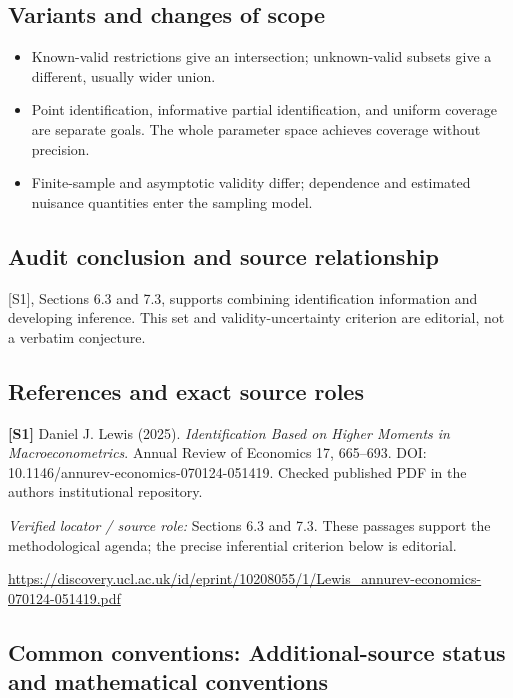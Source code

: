 \documentclass[11pt,a4paper]{article}
\begin{document}
\subsection*{Variants and changes of scope}

\begin{itemize}
\item Known-valid restrictions give an intersection; unknown-valid subsets give a different, usually wider union.
\item Point identification, informative partial identification, and uniform coverage are separate goals. The whole parameter space achieves coverage without precision.
\item Finite-sample and asymptotic validity differ; dependence and estimated nuisance quantities enter the sampling model.
\end{itemize}

\subsection*{Audit conclusion and source relationship}

[S1], Sections 6.3 and 7.3, supports combining identification information and developing inference. This set and validity-uncertainty criterion are editorial, not a verbatim conjecture.

\subsection*{References and exact source roles}

{\footnotesize\raggedright
\par\noindent\textbf{[S1]} Daniel J. Lewis (2025). \emph{Identification Based on Higher Moments in Macroeconometrics}. Annual Review of Economics 17, 665--693. DOI: 10.1146/annurev-economics-070124-051419. Checked published PDF in the author\textquotesingle s institutional repository.\par \textit{Verified locator / source role:} Sections 6.3 and 7.3. These passages support the methodological agenda; the precise inferential criterion below is editorial.\par \url{https://discovery.ucl.ac.uk/id/eprint/10208055/1/Lewis_annurev-economics-070124-051419.pdf}\par\smallskip
}

\subsection*{Common conventions: Additional-source status and mathematical conventions}
\end{document}

